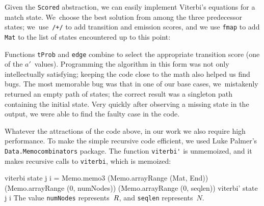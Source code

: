 \documentclass[preprint,nonatbib,blockstyle,nocopyrightspace,times]{sigplanconf}
\newcommand\alignwidth{\ensuremath R} %
\newenvironment{smallverbatim}{\par\small\verbatim}{\endverbatim}
\newcommand\smallverbatiminput[1]{{\par\unskip\small}}
\begin{document}
Given the \texttt{Scored} abstraction, we can easily implement
Viterbi's equations for a match state.
We~choose the best solution
from among the three predecessor states;
we~use~\texttt{/+/} to add transition and emission scores,
and we use \texttt{fmap} to add \texttt{Mat} to the list of states
encountered up to this point:
\smallverbatiminput{vfix}
Functions \texttt{tProb} and \texttt{edge} combine to select the
appropriate transition score (one of the $a'$~values).
Programming the algorithm in this form was not only intellectually
satisfying; keeping the code close to the math also helped us find
bugs.
The most memorable bug was that in one of our base cases, 
we~mistakenly returned an empty path of states;
the correct result was a singleton path containing the initial state.
Very quickly after observing a missing state in the output, we were
able to find the faulty case in the code.

Whatever the attractions of the code above, in our work we also
require high performance.
To make the simple recursive code efficient, we used Luke Palmer's
\texttt{Data.Memocombinators} package.
The function \verb+viterbi'+ is unmemoized,
and it makes recursive calls to \verb+viterbi+, which is memoized:
\begin{smallverbatim}
viterbi state j i = 
  Memo.memo3 (Memo.arrayRange (Mat, End)) 
             (Memo.arrayRange (0, numNodes))
             (Memo.arrayRange (0, seqlen)) 
             viterbi' state j i
\end{smallverbatim}
The value
\texttt{numNodes} represents~$\alignwidth$,
and \texttt{seqlen} represents~$N$.
\end{document}
